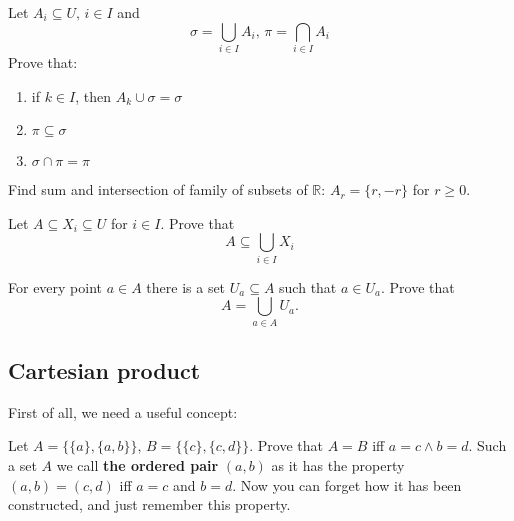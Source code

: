 \begin{prob} Let $A_i\subseteq U,\, i\in I$ and
	$$\sigma = \bigcup_{i\in I}A_i,\, \pi = \bigcap_{i\in I}A_i$$
	Prove that:
	\begin{enumerate}
		\item if $k\in I$, then $A_k\cup \sigma=\sigma$
		\item $\pi \subseteq \sigma$
		\item $\sigma\cap \pi = \pi$
	\end{enumerate}
\end{prob}

\begin{prob}
	Find sum and intersection of family of subsets of $\mathbb R$: $A_r=\{r, -r\}$ for $r\ge 0.$
\end{prob}

\begin{prob}
	Let $A\subseteq X_i \subseteq U$ for $i\in I$. Prove that
	$$A\subseteq \bigcup_{i\in I} X_i$$
\end{prob}

\begin{prob}
	For every point $a\in A$ there is a set $U_a\subseteq A$ such that $a\in U_a$.
	Prove that $$A=\bigcup_{a\in A} U_a.$$
\end{prob}


\subsection{Cartesian product}
First of all, we need a useful concept:
\begin{prob}
	Let $A=\{\{a\}, \{a,b\}\},\, B=\{\{c\},\{c,d\}\}$. Prove that $A=B$ iff $a=c\wedge b=d$. Such a set $A$ we call
	\textbf{the ordered pair} $(a,b)$ as it has the property $(a,b)=(c,d)$ iff $a=c$ and $b=d$.
	Now you can forget how it has been constructed, and just remember this property.
\end{prob}

